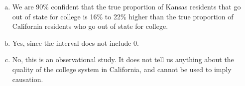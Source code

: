 {\begin{enumerate}[(a)]
\item We are 90\% confident that the true proportion of Kansas residents that go out of state for college is 16\% to 22\% higher than the true proportion of California residents who go out of state for college.

\item Yes, since the interval does not include 0.

\item No, this is an observational study. It does not tell us anything about the quality of the college system in California, and cannot be used to imply causation.

\end{enumerate}
}\label{KansasCaliHS}

%

